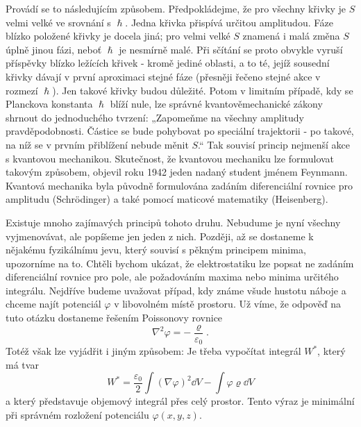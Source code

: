     Provádí se to následujícím způsobem. Předpokládejme, že pro všechny křivky je \(S\) velmi velké
    ve srovnání s \(\hslash\). Jedna křivka přispívá určitou amplitudou. Fáze blízko položené křivky
    je docela jiná; pro velmi velké \(S\) znamená i malá změna \(S\) úplně jinou fázi, neboť
    \(\hslash\) je nesmírně malé. Při sčítání se proto obvykle vyruší příspěvky blízko ležících
    křivek - kromě jediné oblasti, a to té, jejíž sousední křivky dávají v první aproximaci stejné
    fáze (přesněji řečeno stejné akce v rozmezí \(\hslash\)). Jen takové křivky budou důležité.
    Potom v limitním případě, kdy se Planckova konstanta \(\hslash\) blíží nule, lze správné
    kvantověmechanické zákony shrnout do jednoduchého tvrzení: „Zapomeňme na všechny amplitudy
    pravděpodobnosti. Částice se bude pohybovat po speciální trajektorii - po takové, na níž se v
    prvním přiblížení nebude měnit \(S\).“ Tak souvisí princip nejmenší akce s kvantovou mechanikou.
    Skutečnost, že kvantovou mechaniku lze formulovat takovým způsobem, objevil roku 1942 jeden
    nadaný student jménem Feynmann. Kvantová mechanika byla původně formulována zadáním
    diferenciální rovnice pro amplitudu (Schrödinger) a také pomocí maticové matematiky
    (Heisenberg).

    Existuje mnoho zajímavých principů tohoto druhu. Nebudume je nyní všechny vyjmenovávat, ale
    popíšeme jen jeden z nich. Později, až se dostaneme k nějakému fyzikálnímu jevu, který souvisí s
    pěkným principem minima, upozorníme na to. Chtěli bychom ukázat, že elektrostatiku lze popsat ne
    zadáním diferenciální rovnice pro pole, ale požadováním maxima nebo minima určitého integrálu.
    Nejdříve budeme uvažovat případ, kdy známe všude hustotu náboje a chceme najít potenciál
    \(\varphi\) v libovolném místě prostoru. Už víme, že odpověď na tuto otázku dostaneme řešením
    Poissonovy rovnice
    \begin{equation*}
      \nabla^2\varphi = -\dfrac{\varrho}{\varepsilon_0}.
    \end{equation*}
    Totéž však lze vyjádřit i jiným způsobem: Je třeba vypočítat integrál \(W^*\), který má tvar
    \begin{equation*}
      W^* = \dfrac{\varepsilon_0}{2}\int(\nabla\varphi)^2\dd{V} - \int\varphi\varrho\dd{V}
    \end{equation*}
    a který představuje objemový integrál přes celý prostor. Tento výraz je minimální při správném
    rozložení potenciálu \(\varphi(x, y, z)\).


